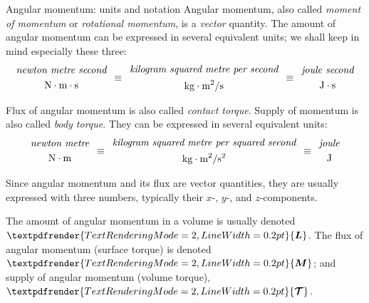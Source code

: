\documentclass[a4paper,12pt,%
onecolumn,oneside,%
british%
]{memoir}
\renewcommand*{\bm}[1]{\textpdfrender{TextRenderingMode=2,LineWidth=0.2pt}{\boldsymbol{#1}}}
\renewcommand*{\|}[1][]{\nonscript\:#1\vert\nonscript\:\mathopen{}}
\newcommand*{\yL}{\bm{L}}%
\newcommand*{\yM}{\bm{M}}%
\newcommand*{\ytoo}{\mathcal{T}}%
\newcommand*{\yto}{\bm{\ytoo}}%
\begin{document}
\begin{definition}{Angular momentum: units and notation}
  Angular momentum, also called \emph{moment of momentum} or \emph{rotational momentum}, is a \emph{vector} quantity. The amount of angular momentum can be expressed in several equivalent units; we shall keep in mind especially these three:
  \begin{equation*}
    \begin{gathered}
      \textit{newton metre second}\\
      \unit{N\cdot m \cdot s}
    \end{gathered}
\enskip\equiv\enskip
    \begin{gathered}
      \textit{kilogram squared metre per second}\\
      \unit{kg\cdot m^{2}/s}
    \end{gathered}
\enskip\equiv\enskip
    \begin{gathered}
      \textit{joule second}\\
      \unit{J\cdot s}
    \end{gathered}
\end{equation*}

\smallskip

Flux of angular momentum is also called \emph{contact torque}. Supply of momentum is also called \emph{body torque}. They can be expressed in several equivalent units:
\begin{equation*}
    \begin{gathered}
      \textit{newton metre}\\
      \unit{N\cdot m}
    \end{gathered}
\enskip\equiv\enskip
    \begin{gathered}
      \textit{kilogram squared metre per squared second}\\
      \unit{kg\cdot m^{2}/s^{2}}
    \end{gathered}
\enskip\equiv\enskip
    \begin{gathered}
      \textit{joule}\\
      \unit{J}
    \end{gathered}
\end{equation*}

Since angular momentum and its flux are vector quantities, they are usually expressed with three numbers, typically their $x$-, $y$-, and $z$-components.

\smallskip

The amount of angular momentum in a volume is usually denoted $\yL$. The flux of angular momentum (surface torque) is denoted $\yM$; and supply of angular momentum (volume torque), $\yto$.
\end{definition}
\end{document}
